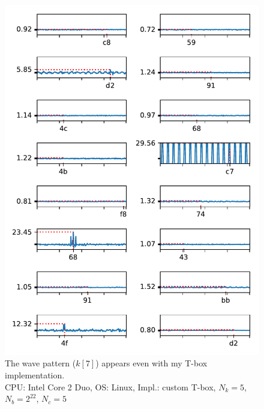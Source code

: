\documentclass[thesis=B,english]{FITthesis}[2019/03/06]
\begin{document}
\begin{figure}
	\centering
	\includegraphics{full_tbox_coreduo.pdf}
	\caption[Custom T-box on Core 2 Duo]{The wave pattern ($k[7]$) appears even with my T-box implementation. \\
	CPU: Intel Core 2 Duo, OS: Linux, Impl.: custom T-box, $N_k = 5$, $N_b = 2^{22}$, $N_c = 5$}
\end{figure}
\end{document}
